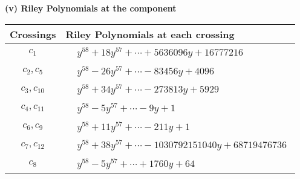 \documentclass[1p]{elsarticle_modified}
\theoremstyle{definition}
\begin{document}
\flushleft \textbf{(v) Riley Polynomials at the component}\newline \\
\begin{tabular}{m{50pt}|m{274pt}}
Crossings & \hspace{64pt}Riley Polynomials at each crossing \\
\hline $$\begin{aligned}c_{1}\end{aligned}$$&$\begin{aligned}
&y^{58}+18 y^{57}+\cdots+5636096 y+16777216
\end{aligned}$\\
\hline $$\begin{aligned}c_{2},c_{5}\end{aligned}$$&$\begin{aligned}
&y^{58}-26 y^{57}+\cdots-83456 y+4096
\end{aligned}$\\
\hline $$\begin{aligned}c_{3},c_{10}\end{aligned}$$&$\begin{aligned}
&y^{58}+34 y^{57}+\cdots-273813 y+5929
\end{aligned}$\\
\hline $$\begin{aligned}c_{4},c_{11}\end{aligned}$$&$\begin{aligned}
&y^{58}-5 y^{57}+\cdots-9 y+1
\end{aligned}$\\
\hline $$\begin{aligned}c_{6},c_{9}\end{aligned}$$&$\begin{aligned}
&y^{58}+11 y^{57}+\cdots-211 y+1
\end{aligned}$\\
\hline $$\begin{aligned}c_{7},c_{12}\end{aligned}$$&$\begin{aligned}
&y^{58}+38 y^{57}+\cdots-1030792151040 y+68719476736
\end{aligned}$\\
\hline $$\begin{aligned}c_{8}\end{aligned}$$&$\begin{aligned}
&y^{58}-5 y^{57}+\cdots+1760 y+64
\end{aligned}$\\
\hline
\end{tabular}\\~\\
\end{document}

